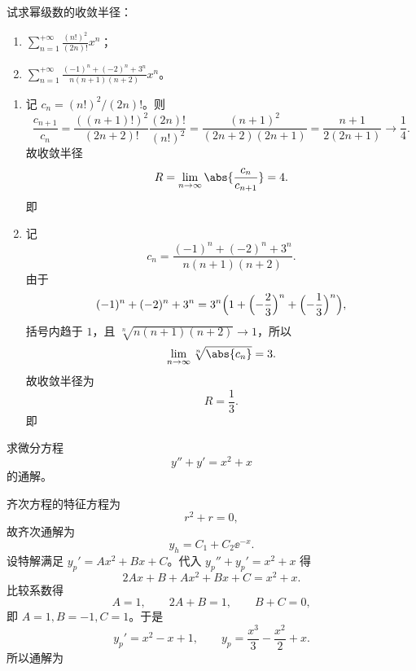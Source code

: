 \begin{question}[幂级数的收敛半径]

试求幂级数的收敛半径：
\begin{enumerate}
\item $\displaystyle \sum_{n=1}^{+\infty}\frac{(n!)^2}{(2n)!}x^n$；
\item $\displaystyle \sum_{n=1}^{+\infty}\frac{(-1)^n+(-2)^n+3^n}{n(n+1)(n+2)}x^n$。
\end{enumerate}

\begin{solution}

\begin{enumerate}
\item 记 $c_n=(n!)^2/(2n)!$。则
\[
\frac{c_{n+1}}{c_n}
=\frac{((n+1)!)^2}{(2n+2)!}\frac{(2n)!}{(n!)^2}
=\frac{(n+1)^2}{(2n+2)(2n+1)}
=\frac{n+1}{2(2n+1)}\to \frac14.
\]
故收敛半径
\[
R=\lim_{n\to\infty}\abs{\frac{c_n}{c_{n+1}}}=4.
\]
即 

\item 记
\[
c_n=\frac{(-1)^n+(-2)^n+3^n}{n(n+1)(n+2)}.
\]
由于
\[
(-1)^n+(-2)^n+3^n=3^n\Bigl(1+\Bigl(-\frac23\Bigr)^n+\Bigl(-\frac13\Bigr)^n\Bigr),
\]
括号内趋于 $1$，且 $\sqrt[n]{n(n+1)(n+2)}\to1$，所以
\[
\lim_{n\to\infty}\sqrt[n]{\abs{c_n}}=3.
\]
故收敛半径为
\[
R=\frac{1}{3}.
\]
即 
\end{enumerate}

\end{solution}
\end{question}

\begin{question}[微分方程通解]

求微分方程
\[
y''+y'=x^2+x
\]
的通解。

\begin{solution}

齐次方程的特征方程为
\[
r^2+r=0,
\]
故齐次通解为
\[
y_h=C_1+C_2\ee^{-x}.
\]
设特解满足 $y_p'=Ax^2+Bx+C$。代入 $y_p''+y_p'=x^2+x$ 得
\[
2Ax+B+Ax^2+Bx+C=x^2+x.
\]
比较系数得
\[
A=1,\qquad 2A+B=1,\qquad B+C=0,
\]
即 $A=1,B=-1,C=1$。于是
\[
y_p'=x^2-x+1,\qquad
y_p=\frac{x^3}{3}-\frac{x^2}{2}+x.
\]
所以通解为

\end{solution}
\end{question}


